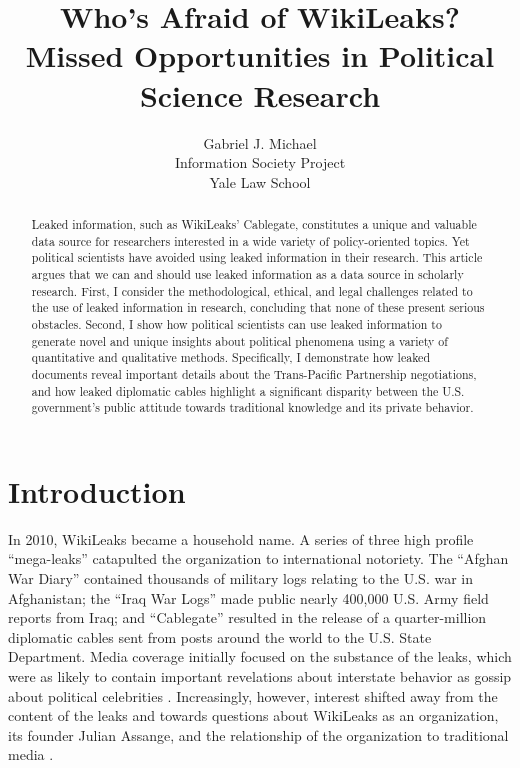 \documentclass[12pt]{article}
\title{Who's Afraid of WikiLeaks? \\ \vspace{2 mm} \large Missed Opportunities in Political Science Research}
\author{Gabriel J. Michael \\
		Information Society Project \\
		Yale Law School \\
		}
\date{}
\begin{document}
\maketitle

\doublespacing

\begin{abstract}
Leaked information, such as WikiLeaks' Cablegate, constitutes a unique and valuable data source for researchers
interested in a wide variety of policy-oriented topics. Yet political scientists have avoided using
leaked information in their research. This article argues that we can and should use leaked information 
as a data source in scholarly research. First, I consider the
methodological, ethical, and legal challenges related to the use of leaked information in research, concluding 
that none of these present serious obstacles. 
Second, I show how political scientists can use leaked information to generate novel and unique 
insights about political phenomena using a variety of quantitative and qualitative methods. Specifically, 
I demonstrate how leaked documents reveal important details about the Trans-Pacific Partnership 
negotiations, and how leaked diplomatic cables highlight a significant disparity between the U.S. government's 
public attitude towards traditional knowledge and its private behavior.
\end{abstract}

\section*{Introduction}

In 2010, WikiLeaks became a household name. A series of three high profile ``mega-leaks'' 
catapulted the organization to international notoriety.
The ``Afghan War Diary'' contained thousands of military logs relating to the U.S. war in Afghanistan;
the ``Iraq War Logs'' made public nearly 400,000 U.S. 
Army field reports from Iraq; and ``Cablegate'' resulted in the release of a quarter-million 
diplomatic cables sent from posts around the world to the U.S. State Department.
Media coverage initially focused on the substance of the leaks, which were as likely to contain 
important revelations about interstate behavior as gossip about political celebrities \citep{shane2010wikileaks,hooper2010silvio}.
Increasingly, however, interest shifted away from the content of the leaks and towards questions 
about WikiLeaks as an organization, its founder Julian Assange, and the relationship of the organization 
to traditional media \citep{saunders2011wikileaks,benkler2011free}.
\end{document}
